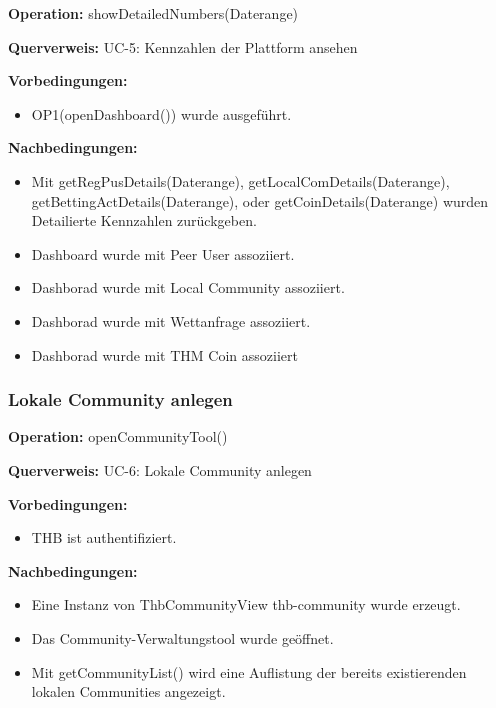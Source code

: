 \documentclass[a4paper,12pt]{article}
\begin{document}
	\begin{contractbox}
		\textbf{Operation:} showDetailedNumbers(Daterange)
		
			\textbf{Querverweis:} UC-5: Kennzahlen der Plattform ansehen
		
		\textbf{Vorbedingungen:}
		\begin{itemize}[noitemsep]
			\item OP1(openDashboard()) wurde ausgeführt.
		\end{itemize}
		
		\textbf{Nachbedingungen:}
		\begin{itemize}[noitemsep]
			\item Mit getRegPusDetails(Daterange), getLocalComDetails(Daterange), getBettingActDetails(Daterange), oder getCoinDetails(Daterange) wurden Detailierte Kennzahlen zurückgeben.
			\item Dashboard wurde mit Peer User assoziiert.
			\item Dashborad wurde mit Local Community assoziiert.
			\item Dashborad wurde mit Wettanfrage assoziiert.
			\item Dashborad wurde mit THM Coin assoziiert
		\end{itemize}
	\end{contractbox}

	\subsubsection{Lokale Community anlegen}
	\begin{contractbox}
		\textbf{Operation:} openCommunityTool()
		
			\textbf{Querverweis:} UC-6: Lokale Community anlegen
		
		\textbf{Vorbedingungen:}
		\begin{itemize}[noitemsep]
			\item THB ist authentifiziert.
		\end{itemize}
		
		\textbf{Nachbedingungen:}
		\begin{itemize}[noitemsep]
			\item Eine Instanz von ThbCommunityView thb-community wurde erzeugt.
			\item Das Community-Verwaltungstool wurde geöffnet.
			\item Mit getCommunityList() wird eine Auflistung der bereits existierenden lokalen Communities angezeigt.
		\end{itemize}
	\end{contractbox}
\end{document}
